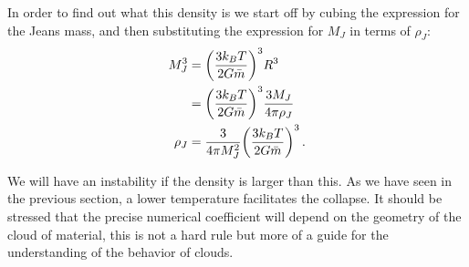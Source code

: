 \documentclass[main.tex]{subfiles}
\begin{document}
In order to find out what this density is we start off by cubing the  
expression for the Jeans mass, and then substituting the expression for \(M_J\) in terms of \(\rho _J\):
%
\begin{align}
M_J^3 &= \qty(\frac{3 k_B T}{2 G \bar{m}})^3 R^3\\
&=  \qty(\frac{3 k_B T}{2 G \bar{m}})^3 \frac{3M_J}{4 \pi \rho _J} \\  
  \rho _J &= \frac{3}{4 \pi M_J^2} \qty(\frac{3 k_B T}{2 G \bar{m}})^3
\,.
\end{align}

We will have an instability if the density is larger than this.
As we have seen in the previous section, a lower temperature facilitates the collapse. 
It should be stressed that the precise numerical coefficient will depend on the geometry of the cloud of material, this is not a hard rule but more of a guide for the understanding of the behavior of clouds.



\end{document}
